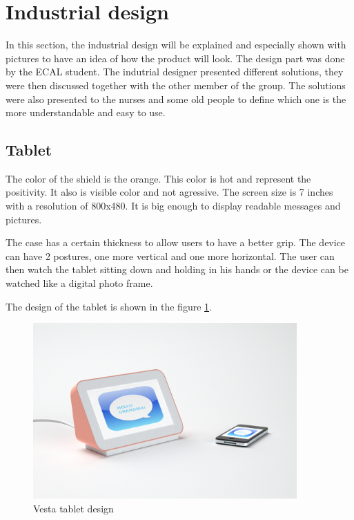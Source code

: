 \section{Industrial design}

In this section, the industrial design will be explained and especially shown with pictures to have an idea of how the product will look. The design part was done by the ECAL student. The indutrial designer presented different solutions, they were then discussed together with the other member of the group. The solutions were also presented to the nurses and some old people to define which one is the more understandable and easy to use.

\subsection{Tablet}

The color of the shield is the orange. This color is hot and represent the positivity. It also is visible color and not agressive. The screen size is 7 inches with a resolution of 800x480. It is big enough to display readable messages and pictures.

The case has a certain thickness to allow users to have a better grip. The device can have 2 postures, one more vertical and one more horizontal. The user can then watch the tablet sitting down and holding in his hands or the device can be watched like a digital photo frame.

The design of the tablet is shown in the figure \ref{fig:vesta design}.

\begin{figure}[!htb]
    \centering
    \includegraphics[width=0.9\textwidth,keepaspectratio]{chap/designFig/VestaRender4.png}
    \caption{Vesta tablet design}
    \label{fig:vesta design}
\end{figure}


